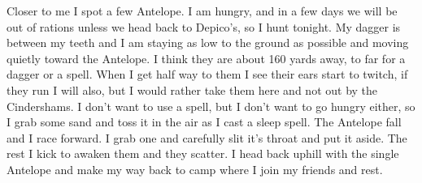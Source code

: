 \documentclass[11pt]{article}
\newcommand*\circled[1]{\tikz[baseline=(char.base)]{
            \node[shape=circle,draw,inner sep=2pt] (char) {#1};}}
\begin{document}
\newpage

Closer to me I spot a few Antelope. I am hungry, and in a few days we will be out of rations unless we head back to Depico’s, so I hunt tonight. My dagger is between my teeth and I am staying as low to the ground as possible and moving quietly toward the Antelope. I think they are about 160 yards away, to far for a dagger or a spell. When I get half way to them I see their ears start to twitch, if they run I will also, but I would rather take them here and not out by the Cindershams. I don’t want to use a spell, but I don’t want to go hungry either, so I grab some sand and toss it in the air as I cast a sleep spell. The Antelope fall and I race forward. I grab one and carefully slit it’s throat and put it aside. The rest I kick to awaken them and they scatter. I head back uphill with the single Antelope and make my way back to camp where I join my friends and rest.

\vspace{1.4cm}
\end{document}
